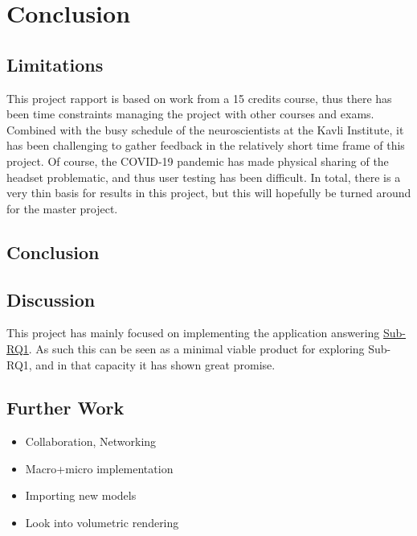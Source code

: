 \chapter{Conclusion}




\section{Limitations}

This project rapport is based on work from a 15 credits course, thus there has been time constraints managing the project with other courses and exams. Combined with the busy schedule of the neuroscientists at the Kavli Institute, it has been challenging to gather feedback in the relatively short time frame of this project.
Of course, the COVID-19 pandemic has made physical sharing of the headset problematic, and thus user testing has been difficult. 
In total, there is a very thin basis for results in this project, but this will hopefully be turned around for the master project.

\section{Conclusion}

\section{Discussion}



This project has mainly focused on implementing the application answering \href{subrq1}{Sub-RQ1}. As such this can be seen as a minimal viable product for exploring Sub-RQ1, and in that capacity it has shown great promise.



\section{Further Work}\label{chap:futurework}

\begin{itemize}
    \item Collaboration, Networking
    \item Macro+micro implementation
    \item Importing new models
    \item Look into volumetric rendering  
\end{itemize}
